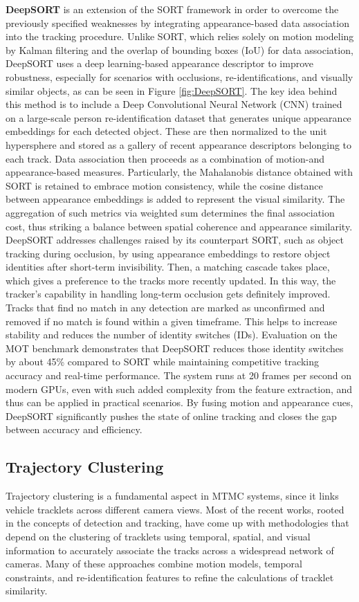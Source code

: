 \textbf{DeepSORT} is an extension of the SORT framework in order to overcome the previously specified weaknesses by integrating appearance-based data association into the tracking procedure. Unlike SORT, which relies solely on motion modeling by Kalman filtering and the overlap of bounding boxes (IoU) for data association, DeepSORT uses a deep learning-based appearance descriptor to improve robustness, especially for scenarios with occlusions, re-identifications, and visually similar objects, as can be seen in Figure \ref{fig:DeepSORT}.
The key idea behind this method is to include a Deep Convolutional Neural Network (CNN) trained on a large-scale person re-identification dataset that generates unique appearance embeddings for each detected object. These are then normalized to the unit hypersphere and stored as a gallery of recent appearance descriptors belonging to each track. Data association then proceeds as a combination of motion-and appearance-based measures. Particularly, the Mahalanobis distance obtained with SORT is retained to embrace motion consistency, while the cosine distance between appearance embeddings is added to represent the visual similarity. The aggregation of such metrics via weighted sum determines the final association cost, thus striking a balance between spatial coherence and appearance similarity.
DeepSORT addresses challenges raised by its counterpart SORT, such as object tracking during occlusion, by using appearance embeddings to restore object identities after short-term invisibility. Then, a matching cascade takes place, which gives a preference to the tracks more recently updated. In this way, the tracker's capability in handling long-term occlusion gets definitely improved. Tracks that find no match in any detection are marked as unconfirmed and removed if no match is found within a given timeframe. This helps to increase stability and reduces the number of identity switches (IDs).
Evaluation on the MOT benchmark demonstrates that DeepSORT reduces those identity switches by about 45\% compared to SORT while maintaining competitive tracking accuracy and real-time performance. The system runs at 20 frames per second on modern GPUs, even with such added complexity from the feature extraction, and thus can be applied in practical scenarios. By fusing motion and appearance cues, DeepSORT significantly pushes the state of online tracking and closes the gap between accuracy and efficiency.

\subsection{Trajectory Clustering}
Trajectory clustering is a fundamental aspect in MTMC systems, since it links vehicle tracklets across different camera views. Most of the recent works, rooted in the concepts of detection and tracking, have come up with methodologies that depend on the clustering of tracklets using temporal, spatial, and visual information to accurately associate the tracks across a widespread network of cameras. Many of these approaches combine motion models, temporal constraints, and re-identification features to refine the calculations of tracklet similarity.


